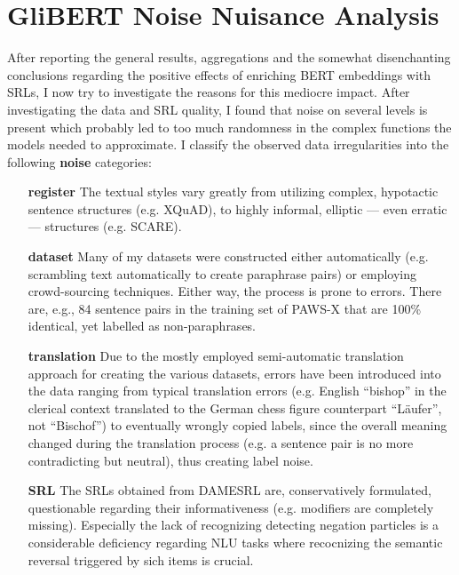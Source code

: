 \section{GliBERT Noise Nuisance Analysis}
\label{sec:glinoise}


After reporting the general results, aggregations and the somewhat disenchanting conclusions
regarding the positive effects of enriching BERT embeddings with SRLs, I now try to investigate
the reasons for this mediocre impact. After investigating the data and SRL quality, I found that
noise on several levels is present which probably led to too much randomness in the complex
functions the models needed to approximate. I classify the observed data irregularities into the
following \textbf{noise} categories:


\begin{itemize}
  \item[\textbf{register}] The textual styles vary greatly from utilizing complex,
                         hypotactic sentence structures (e.g. XQuAD), to highly
                         informal, elliptic --- even erratic --- structures
                         (e.g. SCARE).
 \item[\textbf{dataset}] Many of my datasets were constructed either automatically
                         (e.g. scrambling text automatically to create paraphrase pairs)
                         or employing crowd-sourcing techniques. Either way, the process
                         is prone to errors. There are, e.g., 84 sentence pairs in the training
                         set of PAWS-X that are 100\% identical, yet labelled as non-paraphrases.
 \item[\textbf{translation}] Due to the mostly employed semi-automatic translation
                         approach for creating the various datasets, errors
                         have been introduced into the data ranging from typical
                         translation errors (e.g. English ``bishop'' in the clerical
                         context translated to the German chess figure counterpart
                         ``Läufer'', not ``Bischof'') to eventually wrongly copied
                         labels, since the overall meaning changed during
                         the translation process (e.g. a sentence pair is no more
                         contradicting but neutral), thus creating label noise.
 \item[\textbf{SRL}] The SRLs obtained from DAMESRL are, conservatively formulated, questionable
                         regarding their informativeness (e.g. modifiers are completely missing). Especially the lack of
                         recognizing detecting negation particles is a considerable deficiency regarding NLU tasks where
                         recocnizing the semantic reversal triggered by sich items is crucial.
\end{itemize}


